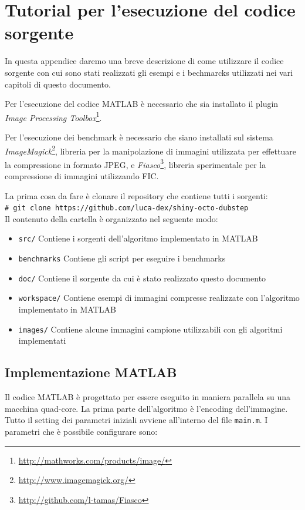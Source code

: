\documentclass[11pt,a4paper,appendixprefix=true,numbers=noenddot]{scrreprt}
\newcommand{\shellcmd}[1]{\\\indent\indent\texttt{\footnotesize\# #1}\\}
\begin{document}
\appendix

\chapter{Tutorial per l'esecuzione del codice sorgente}

In questa appendice daremo una breve descrizione di come utilizzare il codice sorgente con cui sono stati realizzati gli esempi e i bechmarcks utilizzati nei vari capitoli di questo documento. 

Per l'esecuzione del codice MATLAB è necessario che sia installato il plugin \textit{Image Processing Toolbox}\footnote{\url{http://mathworks.com/products/image/}}.

Per l'esecuzione dei benchmark è necessario che siano installati sul sistema \textit{ImageMagick}\footnote{\url{http://www.imagemagick.org/}}, libreria per la manipolazione di immagini utilizzata per effettuare la compressione in formato JPEG, e \textit{Fiasco}\footnote{\url{http://github.com/l-tamas/Fiasco}}, libreria sperimentale per la compressione di immagini utilizzando FIC.

\noindent La prima cosa da fare è clonare il repository che contiene tutti i sorgenti:
\shellcmd{git clone https://github.com/luca-dex/shiny-octo-dubstep}

Il contenuto della cartella è organizzato nel seguente modo:

\begin{itemize}
\item \texttt{src/} Contiene i sorgenti dell'algoritmo implementato in MATLAB
\item \texttt{benchmarks} Contiene gli script per eseguire i benchmarks
\item \texttt{doc/} Contiene il sorgente da cui è stato realizzato questo documento
\item \texttt{workspace/} Contiene esempi di immagini compresse realizzate con l'algoritmo implementato in MATLAB
\item \texttt{images/} Contiene alcune immagini campione utilizzabili con gli algoritmi implementati
\end{itemize}

\section{Implementazione MATLAB}

Il codice MATLAB è progettato per essere eseguito in maniera parallela su una macchina quad-core. La prima parte dell'algoritmo è l'encoding dell'immagine. Tutto il setting dei parametri iniziali avviene all'interno del file \texttt{main.m}. I parametri che è possibile configurare sono:
\end{document}
